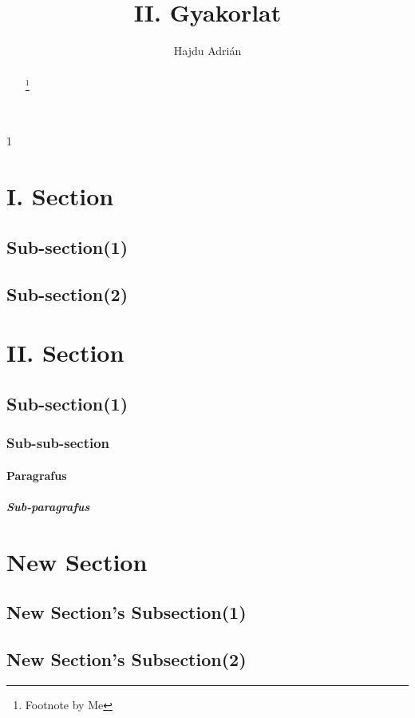 \documentclass[twoside, twocolumn]{article}
\author{Hajdu Adrián}
\title{II. Gyakorlat}
\begin{document}
\setcounter{tocdepth}{5}1
\setcounter{secnumdepth}{5}
\maketitle

\begin{abstract}
\lipsum[1-2]
\footnote{Footnote by Me}
\end{abstract}

\tableofcontents

\newpage
\section{I. Section}
\subsection{Sub-section(1)}
\lipsum[1-4]
\subsection{Sub-section(2)}
\lipsum[1-6]
\section[second]{II. Section}
\subsection{Sub-section(1)}
\subsubsection{Sub-sub-section}
\paragraph{Paragrafus}
\subparagraph{Sub-paragrafus}

\appendix
\newpage
\section{New Section}
\subsection{New Section's Subsection(1)}
\begin{quote}
\lipsum[1-2]
\end{quote}
\subsection{New Section's Subsection(2)}
\begin{quotation}
\lipsum[1-2]
\end{quotation}
\end{document}

